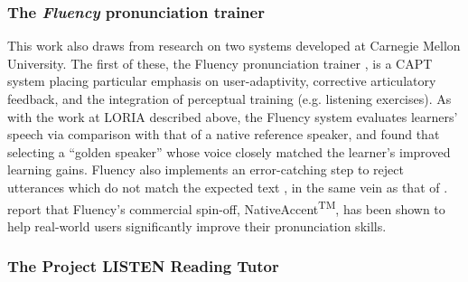 
	\subsubsection{The \textit{Fluency} pronunciation trainer}
	
	This work also draws from research on two systems developed at Carnegie Mellon University.
%
	The first of these, the Fluency pronunciation trainer \citep{Eskenazi1998,Eskenazi2000}, is a CAPT system placing particular emphasis on
user-adaptivity, corrective articulatory feedback, and the integration of perceptual training (e.g. listening exercises). As with the work at LORIA described above, the Fluency system evaluates learners' speech via comparison with that of a native reference speaker, and \textcite{Probst2002} found that selecting a ``golden speaker'' whose voice closely matched the learner's improved learning gains.  Fluency also implements an error-catching step to reject utterances which do not match the expected text \citep{Eskenazi2000}, in the same vein as that of \textcite{Mesbahi2011,Orosanu2012}. \textcite{Eskenazi2007} report that Fluency's commercial spin-off, NativeAccent\textsuperscript{TM}, has been shown to help real-world users significantly improve their pronunciation skills.
	
	\subsubsection{The Project LISTEN Reading Tutor}
	

